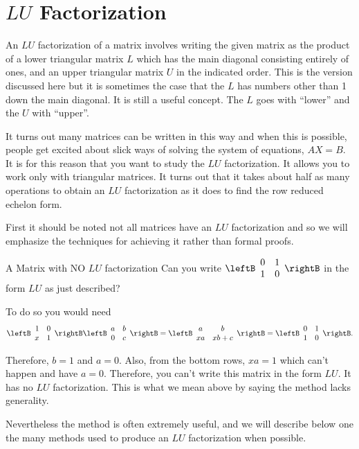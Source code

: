 \section{$LU$ Factorization}

An $LU$ factorization of a matrix involves writing the given matrix as the
product of a lower triangular matrix $L$ which has the main diagonal consisting
entirely of ones, and an upper triangular matrix $U$ in the indicated
order. This is the version discussed here but it is sometimes the case that
the $L$ has numbers other than 1 down the main diagonal. It is still a
useful concept. The $L$ goes with ``lower'' and the $U$ with ``upper''.

It turns out many matrices can be written in this way and when this is
possible, people get excited about slick ways of solving the system of
equations, $AX=B$. It is for this reason that you want to
study the $LU$ factorization. It allows you to work only with
triangular matrices. It turns out that it takes about half as many
operations to obtain an $LU$ factorization as it does to find the row
reduced echelon form.

First it should be noted not all matrices have an $LU$ factorization and so
we will emphasize the techniques for achieving it rather than formal proofs.

\begin{example}{A Matrix with NO $LU$ factorization}
Can you write $\leftB
\begin{array}{rr}
0 & 1 \\
1 & 0
\end{array}
\rightB $ in the form $LU$ as just described?
\end{example}

\begin{solution}
To do so you would need 
\begin{equation*}
\leftB 
\begin{array}{rr}
1 & 0 \\ 
x & 1
\end{array}
\rightB \leftB 
\begin{array}{rr}
a & b \\ 
0 & c
\end{array}
\rightB =\allowbreak \leftB 
\begin{array}{cc}
a & b \\ 
xa & xb+c
\end{array}
\rightB =\leftB 
\begin{array}{rr}
0 & 1 \\ 
1 & 0
\end{array}
\rightB .
\end{equation*}

Therefore, $b=1$ and $a=0.$ Also, from the bottom rows, $xa=1$ which can't
happen and have $a=0.$ Therefore, you can't write this matrix in the form $%
LU.$ It has no $LU$ factorization. This is what we mean above by saying the
method lacks generality.

Nevertheless the method is often extremely useful, and we will describe
below one the many methods used to produce an $LU$ factorization when
possible.
\end{solution}